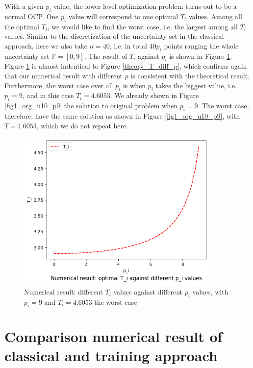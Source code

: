 \documentclass  [
  paper    = a4,
  BCOR     = 10mm,
  twoside,
  fontsize = 12pt,
  fleqn,
  toc      = bibnumbered,
  toc      = listofnumbered,
  numbers  = noendperiod,
  headings = normal,
  listof   = leveldown,
  version  = 3.03
]                                       {scrreprt}
\newcommand{\<}{\langle}
\renewcommand{\>}{\rangle}
\begin{document}
With a given $p_i$ value, the lower level optimization problem turns out to be a normal OCP. One $p_i$ value will correspond to one optimal $T_i$ values. Among all the optimal $T_i$, we would like to find the worst case, i.e. the largest among all $T_i$ values. Similar to the discretization of the uncertainty set in the classical approach, here we also take $n=40$, i.e. in total $40 p_i$ points ranging the whole uncertainty set $\mathbb{P}=[0,9]$.  The result of $T_i$ against $p_i$ is shown in Figure \ref{fig_ta_numerical_T_p}.  Figure \ref{fig_ta_numerical_T_p} is almost indentical to Figure \ref{theory_T_diff_p}, which confirms again that our numerical result with different $p$ is consistent with the theoretical result. Furthermore, the worst case over all $p_i$ is when $p_i$ takes the biggest value, i.e. $p_i =9$, and in this case $T_i = 4.6053$.  We already shown in Figure \ref{fig1_org_u10_p9} the solution to original problem when $p_i=9$. The worst case, therefore, have the same solution as shown in Figure \ref{fig1_org_u10_p9}, with  $T=4.6053$, which we do not repeat here. 

\begin{figure}[H]
	\centerline{\includegraphics[width=10cm]{numerical_T_p.png}}
	\caption{Numerical result: different $T_i$ values against different $p_i$ values, with $p_i=9$ and  $T_i=4.6053$ the worst case}
	\label{fig_ta_numerical_T_p}
\end{figure}


\section{Comparison numerical result of classical and training approach}
\label{Sec_NR}
\end{document}
